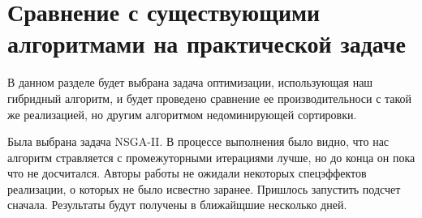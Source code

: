 \section{Сравнение с существующими алгоритмами на практической задаче}

В данном разделе будет выбрана задача оптимизации, использующая наш гибридный алгоритм, и будет проведено сравнение
ее производительноси с такой же реализацией, но другим алгоритмом недоминирующей сортировки.

Была выбрана задача NSGA-II. В процессе выполнения было видно, что нас алгоритм стравляется с промежуторными
итерациями лучше, но до конца он пока что не досчитался. Авторы работы не ожидали некоторых спецэффектов реализации, о
которых не было исвестно заранее.
Пришлось запустить подсчет сначала.
Результаты будут получены в ближайщшие несколько дней.


